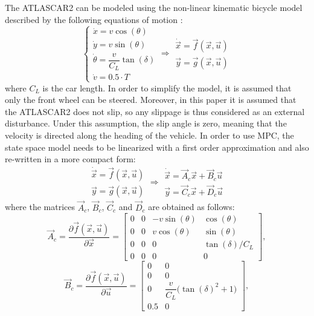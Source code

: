 The ATLASCAR2 can be modeled using the non-linear kinematic bicycle model described by the following equations of motion \cite{safety} \cite{swarms}:
\begin{equation*}
\label{eqn:dynamics_model_obstacle_avoidance}
\left \{ \begin{array}{llll}
\dot{x} = v\cos(\theta)\\
\dot{y} = v\sin(\theta)\\
\dot{\theta} =\dfrac{v}{C_L}\tan(\delta)\\
\dot{v} =0.5 \cdot T
\end{array} 
\right .
\Longrightarrow 
\begin{array}{llll}
\dot{\vec{x}} = \vec{f}(\vec{x},\vec{u})\\
\vec{y} = \vec{g}(\vec{x},\vec{u})
\end{array}
\end{equation*}
where $C_L$ is the car length. In order to simplify the model, it is assumed that only the front wheel can be steered. Moreover, in this paper it is assumed that the ATLASCAR2 does not slip, so any slippage is thus considered as an external disturbance. Under this assumption, the slip angle is zero, meaning that the velocity is directed along the heading of the vehicle. In order to use MPC, the state space model needs to be linearized with a first order approximation and also re-written in a more compact form:
\begin{equation}
\label{eqn:dynamics_model_non_linear}
\begin{array}{llll}
\dot{\vec{x}} = \vec{f}(\vec{x},\vec{u})\\
\vec{y} = \vec{g}(\vec{x},\vec{u})
\end{array} \Longrightarrow
\begin{array}{ll}
\dot{\vec{x}} =\vec{A}_c \vec{x}+ \vec{B}_c \vec{u}\\
\vec{y} =\vec{C}_c \vec{x} + \vec{D}_c \vec{u}
\end{array}
\end{equation}
where the matrices $\vec{A}_c$, $\vec{B}_c$, $\vec{C}_c$ and $\vec{D}_c$ are obtained as follows:
\[ 
\vec{A}_c=\frac{\partial \vec{f}(\vec{x},\vec{u})}{\partial \vec{x}}=\begin{bmatrix}
0&0&-v\sin(\theta)&\cos(\theta)\\
0&0&v\cos(\theta)&\sin(\theta)\\
0&0&0&\tan(\delta)/C_L\\
0&0&0&0
\end{bmatrix},
\]
\[
\vec{B}_c=\frac{\partial \vec{f}(\vec{x},\vec{u})}{\partial \vec{u}}=\begin{bmatrix}
0&0\\
0&0\\
0&\dfrac{v}{C_L}\big(\tan(\delta)^2+1\big)\\
0.5&0
\end{bmatrix},
\]
